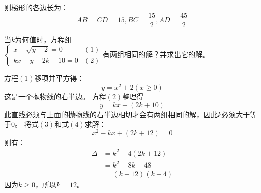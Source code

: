\documentclass[answers]{exam}
\begin{document}
\begin{questions}
\begin{solution}
		则梯形的各边长为：
		\begin{equation*}
			AB = CD = 15, BC = \frac{15}{2}, AD = \frac{45}{2}
		\end{equation*}
	\end{solution}

	\question 当$k$为何值时，方程组 \begin{math}
		\left\{
		\begin{array}{lr}
			x - \sqrt{y - 2} = 0 & (1) \\
			kx - y - 2k - 10 = 0 & (2)
		\end{array}
		\right. 有两组相同的解？并求出它的解。
	\end{math}

	\begin{solution}
		方程$(1)$移项并平方得：
		\begin{equation*}
			y=x^2 + 2 (x \geqslant 0) \tag{3}
		\end{equation*}
		这是一个抛物线的右半边。
		方程$(2)$整理得
		\begin{equation*}
			y=kx - (2k + 10) \tag{4}
		\end{equation*}
		此直线必须与上面的抛物线的右半边相切才会有两组相同的解，因此$k$必须大于等于0。
		将式$(3)$和式$(4)$求解：
		\begin{equation*}
			x^2 - kx + (2k + 12) = 0
		\end{equation*}
		则有：
		\begin{align*}
			\Delta & = k^2 - 4(2k + 12) \\
			       & = k^2 - 8k - 48    \\
			       & = (k-12)(k+4)
		\end{align*}
		因为$k\geqslant 0$，所以$k=12$。
	\end{solution}

\end{questions}
\end{document}
